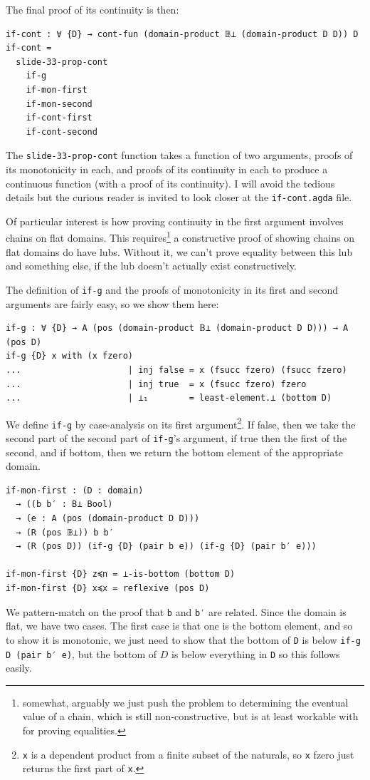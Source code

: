 \documentclass[12pt,a4paper,twoside,openright]{report}
\begin{document}
The final proof of its continuity is then:
\begin{verbatim}
if-cont : ∀ {D} → cont-fun (domain-product 𝔹⊥ (domain-product D D)) D
if-cont =
  slide-33-prop-cont
    if-g
    if-mon-first 
    if-mon-second
    if-cont-first
    if-cont-second
\end{verbatim}
The \texttt{slide-33-prop-cont} function takes a function of two arguments, proofs of its monotonicity in each, and proofs of its continuity in each to produce a continuous function (with a proof of its continuity). I will avoid the tedious details but the curious reader is invited to look closer at the \texttt{if-cont.agda} file.

Of particular interest is how proving continuity in the first argument involves chains on flat domains. This requires\footnote{somewhat, arguably we just push the problem to determining the eventual value of a chain, which is still non-constructive, but is at least workable with for proving equalities.} a constructive proof of showing chains on flat domains do have lubs. Without it, we can't prove equality between this lub and something else, if the lub doesn't actually exist constructively. 

The definition of \texttt{if-g} and the proofs of monotonicity in its first and second arguments are fairly easy, so we show them here:
\begin{verbatim}
if-g : ∀ {D} → A (pos (domain-product 𝔹⊥ (domain-product D D))) → A (pos D)
if-g {D} x with (x fzero)
...                     | inj false = x (fsucc fzero) (fsucc fzero)
...                     | inj true  = x (fsucc fzero) fzero
...                     | ⊥₁        = least-element.⊥ (bottom D)
\end{verbatim}
We define \texttt{if-g} by case-analysis on its first argument\footnote{\texttt{x} is a dependent product from a finite subset of the naturals, so \texttt{x} fzero just returns the first part of \texttt{x}.}. If false, then we take the second part of the second part of \texttt{if-g}'s argument, if true then the first of the second, and if bottom, then we return the bottom element of the appropriate domain. 
\begin{verbatim}
if-mon-first : (D : domain)
  → ((b b′ : B⊥ Bool)
  → (e : A (pos (domain-product D D)))
  → (R (pos 𝔹⊥)) b b′
  → (R (pos D)) (if-g {D} (pair b e)) (if-g {D} (pair b′ e)))

if-mon-first {D} z≼n = ⊥-is-bottom (bottom D)
if-mon-first {D} x≼x = reflexive (pos D)
\end{verbatim}
We pattern-match on the proof that \texttt{b} and \texttt{b′} are related. Since the domain is flat, we have two cases. The first case is that one is the bottom element, and so to show it is monotonic, we just need to show that the bottom of \texttt{D} is below \texttt{if-g {D} (pair b′ e)}, but the bottom of $D$ is below everything in \texttt{D} so this follows easily.
\end{document}
